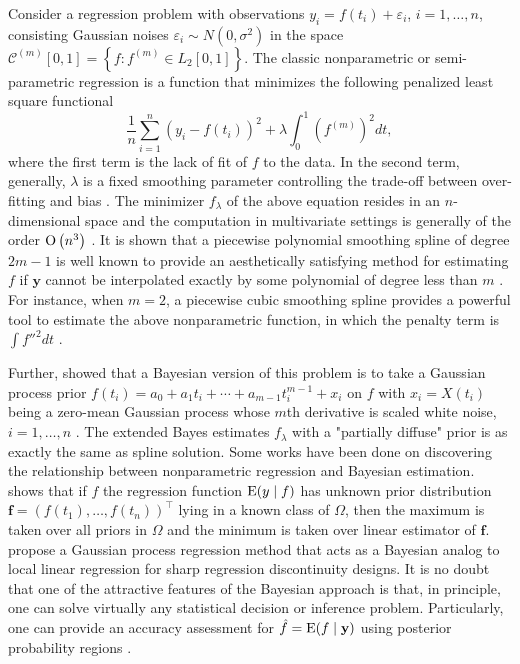 Consider a regression problem with observations $y_i = f(t_i)+\varepsilon_i$, $i=1,\ldots,n$, consisting \iid Gaussian noises $\varepsilon_i\sim N(0,\sigma^2)$ in the space $\mathcal{C}^{(m)}[0,1]=\left\lbrace  f:f^{(m)}\in \mathit{L}_2[0,1] \right\rbrace$. The classic nonparametric or semi-parametric regression is a function that minimizes the following penalized least square functional 
\begin{equation}\label{GaussianProcessGeneralObjective}
\frac{1}{n}\sum_{i=1}^{n}\left( y_i-f(t_i) \right)^2 + \lambda \int_{0}^{1} \left( f^{(m)}\right)^2dt, 
\end{equation}
where the first term is the lack of fit of $f$ to the data. In the second term, generally, $\lambda$ is a fixed smoothing parameter controlling the trade-off between over-fitting and bias \cite{esl2009}. The minimizer $f_\lambda$ of the above equation resides in an $n$-dimensional space and the computation in multivariate settings is generally of the order ${\rm O}\left(n^3\right)$ \cite{kim2004smoothing}. It is shown that a piecewise polynomial smoothing spline of degree $2m-1$ is well known to provide an aesthetically satisfying method for estimating $f$ if $\mathbf{y}$ cannot be interpolated exactly by some polynomial of degree less than $m$ \cite{schoenberg1964spline}. For instance, when $m=2$, a piecewise cubic smoothing spline provides a powerful tool to estimate the above nonparametric function, in which the penalty term is $\int f''^2dt$ \cite{hastie1990generalized}. 


Further, \cite{wahba1978improper} showed that a Bayesian version of this problem is to take a Gaussian process prior $f(t_i) = a_0+a_1t_i+\cdots + a_{m-1}t_i^{m-1} + x_i$ on $f$ with $x_i=X(t_i)$ being a zero-mean Gaussian process whose $m$th derivative is scaled white noise, $i=1,\ldots,n$ \cite{speckman2003fully}. The extended Bayes estimates $f_\lambda$ with a "partially diffuse" prior is as exactly the same as spline solution. Some works have been done on discovering the relationship between nonparametric regression and Bayesian estimation. \cite{heckman1991minimax} shows that if $f$ the regression function $\mathrm{E}(y\mid f)$ has unknown prior distribution  $\mathbf{f}=(f(t_1),\ldots,f(t_n))^\top$ lying in a known class of $\Omega$, then the maximum is taken over all priors in $\Omega$ and the minimum is taken over linear estimator of $\mathbf{f}$. \cite{branson2017nonparametric} propose a Gaussian process regression method that acts as a Bayesian analog to local linear regression for sharp regression discontinuity designs. It is no doubt that one of the attractive features of the Bayesian approach is that, in principle, one can solve virtually any statistical decision or inference problem. Particularly, one can provide an accuracy assessment for $\hat{f}=\mathrm{E} (f\mid \mathbf{y})$ using posterior probability regions \cite{cox1993analysis}. 


